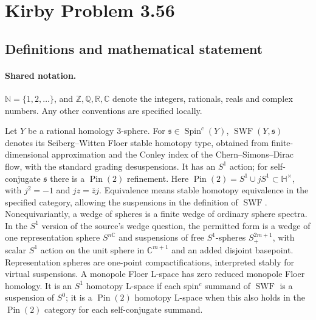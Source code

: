 \documentclass[11pt]{article}
\begin{document}
\section{Kirby Problem 3.56}\label{statement}

\subsection{Definitions and mathematical statement}

\paragraph{Shared notation.}$\mathbb N=\{1,2,\ldots\}$, and $\mathbb Z,\mathbb Q,\mathbb R,\mathbb C$ denote the integers, rationals, reals and complex numbers. Any other conventions are specified locally.


Let $Y$ be a rational homology $3$-sphere. For $\mathfrak s\in\operatorname{Spin}^c(Y)$, $\operatorname{SWF}(Y,\mathfrak s)$ denotes its Seiberg--Witten Floer stable homotopy type, obtained from finite-dimensional approximation and the Conley index of the Chern--Simons--Dirac flow, with the standard grading desuspensions. It has an $S^1$ action; for self-conjugate $\mathfrak s$ there is a $\operatorname{Pin}(2)$ refinement. Here $\operatorname{Pin}(2)=S^1\cup jS^1\subset\mathbb H^\times$, with $j^2=-1$ and $jz=\bar z j$.
Equivalence means stable homotopy equivalence in the specified category, allowing the suspensions in the definition of $\operatorname{SWF}$. Nonequivariantly, a wedge of spheres is a finite wedge of ordinary sphere spectra. In the $S^1$ version of the source's wedge question, the permitted form is a wedge of one representation sphere $S^{n\mathbb C}$ and suspensions of free $S^1$-spheres $S^{2m+1}_+$, with scalar $S^1$ action on the unit sphere in $\mathbb C^{m+1}$ and an added disjoint basepoint. Representation spheres are one-point compactifications, interpreted stably for virtual suspensions.
A monopole Floer L-space has zero reduced monopole Floer homology. It is an $S^1$ homotopy L-space if each spin$^c$ summand of $\operatorname{SWF}$ is a suspension of $S^0$; it is a $\operatorname{Pin}(2)$ homotopy L-space when this also holds in the $\operatorname{Pin}(2)$ category for each self-conjugate summand.
\end{document}
